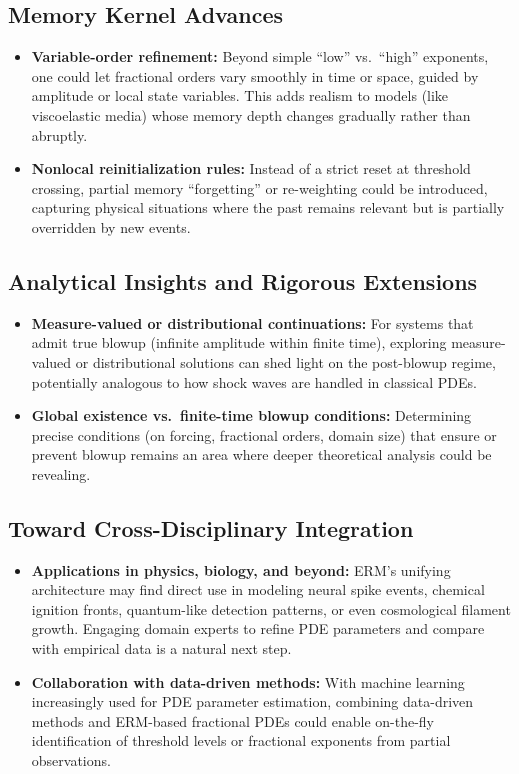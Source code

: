 \documentclass[12pt]{article}
\begin{document}
\subsection{Memory Kernel Advances}
\begin{itemize}
    \item \textbf{Variable-order refinement:}
    Beyond simple “low” vs.\ “high” exponents, one could let fractional orders
    vary smoothly in time or space, guided by amplitude or local state variables.
    This adds realism to models (like viscoelastic media) whose memory depth
    changes gradually rather than abruptly.
    \item \textbf{Nonlocal reinitialization rules:}
    Instead of a strict reset at threshold crossing, partial memory “forgetting”
    or re-weighting could be introduced, capturing physical situations where the
    past remains relevant but is partially overridden by new events.
\end{itemize}

\subsection{Analytical Insights and Rigorous Extensions}
\begin{itemize}
    \item \textbf{Measure-valued or distributional continuations:}
    For systems that admit true blowup (infinite amplitude within finite time),
    exploring measure-valued or distributional solutions can shed light on the
    post-blowup regime, potentially analogous to how shock waves are handled in
    classical PDEs.
    \item \textbf{Global existence vs.\ finite-time blowup conditions:}
    Determining precise conditions (on forcing, fractional orders, domain size)
    that ensure or prevent blowup remains an area where deeper theoretical
    analysis could be revealing. 
\end{itemize}

\subsection{Toward Cross-Disciplinary Integration}
\begin{itemize}
    \item \textbf{Applications in physics, biology, and beyond:}
    ERM’s unifying architecture may find direct use in modeling neural spike
    events, chemical ignition fronts, quantum-like detection patterns, or even
    cosmological filament growth. Engaging domain experts to refine PDE
    parameters and compare with empirical data is a natural next step.
    \item \textbf{Collaboration with data-driven methods:}
    With machine learning increasingly used for PDE parameter estimation,
    combining data-driven methods and ERM-based fractional PDEs could enable
    on-the-fly identification of threshold levels or fractional exponents from
    partial observations.
\end{itemize}
\end{document}
